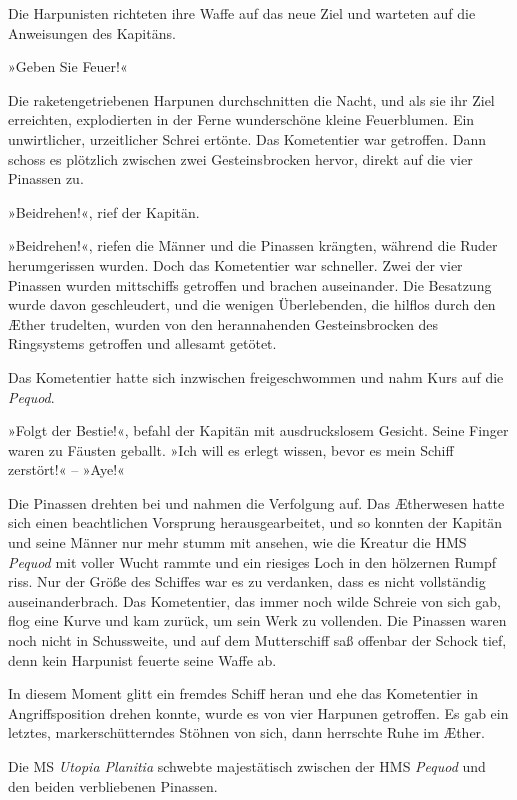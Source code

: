 Die Harpunisten richteten ihre Waffe auf das neue Ziel und warteten
auf die Anweisungen des Kapitäns.

»Geben Sie Feuer!«

Die raketengetriebenen Harpunen durchschnitten die Nacht, und als
sie ihr Ziel erreichten, explodierten in der Ferne wunderschöne
kleine Feuerblumen. Ein unwirtlicher, urzeitlicher Schrei ertönte.
Das Kometentier war getroffen. Dann schoss es plötzlich zwischen
zwei Gesteinsbrocken hervor, direkt auf die vier Pinassen zu.

»Beidrehen!«, rief der Kapitän.

»Beidrehen!«, riefen die Männer und die Pinassen krängten, während
die Ruder herumgerissen wurden. Doch das Kometentier war schneller.
Zwei der vier Pinassen wurden mittschiffs getroffen und brachen
auseinander. Die Besatzung wurde davon geschleudert, und die
wenigen Überlebenden, die hilflos durch den Æther trudelten, wurden
von den herannahenden Gesteinsbrocken des Ringsystems getroffen und
allesamt getötet.

Das Kometentier hatte sich inzwischen freigeschwommen und nahm Kurs
auf die \textit{Pequod}.

»Folgt der Bestie!«, befahl der Kapitän mit ausdruckslosem Gesicht.
Seine Finger waren zu Fäusten geballt. »Ich will es erlegt wissen,
bevor es mein Schiff zerstört!« – »Aye!«

Die Pinassen drehten bei und nahmen die Verfolgung auf. Das
Ætherwesen hatte sich einen beachtlichen Vorsprung
herausgearbeitet, und so konnten der Kapitän und seine Männer nur
mehr stumm mit ansehen, wie die Kreatur die HMS \textit{Pequod} mit voller
Wucht rammte und ein riesiges Loch in den hölzernen Rumpf riss. Nur
der Größe des Schiffes war es zu verdanken, dass es nicht
vollständig auseinanderbrach. Das Kometentier, das immer noch wilde
Schreie von sich gab, flog eine Kurve und kam zurück, um sein Werk
zu vollenden. Die Pinassen waren noch nicht in Schussweite, und auf
dem Mutterschiff saß offenbar der Schock tief, denn kein Harpunist
feuerte seine Waffe ab.

\bigpar

In diesem Moment glitt ein fremdes Schiff heran und ehe das
Kometentier in Angriffsposition drehen konnte, wurde es von vier
Harpunen getroffen. Es gab ein letztes, markerschütterndes Stöhnen
von sich, dann herrschte Ruhe im Æther.

Die MS \textit{Utopia Planitia} schwebte majestätisch zwischen der HMS
\textit{Pequod} und den beiden verbliebenen Pinassen.

